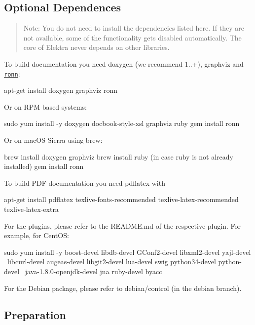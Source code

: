\subsection*{Optional Dependences}

\begin{quote}
Note\+: You do not need to install the dependencies listed here. If they are not available, some of the functionality gets disabled automatically. The core of Elektra never depends on other libraries. \end{quote}


To build documentation you need doxygen (we recommend 1..+), graphviz and \href{https://github.com/rtomayko/ronn/blob/master/INSTALLING#files}{\tt ronn}\+: \begin{DoxyVerb}    apt-get install doxygen graphviz ronn
\end{DoxyVerb}


Or on R\+PM based systems\+: \begin{DoxyVerb}    sudo yum install -y doxygen docbook-style-xsl graphviz ruby
    gem install ronn
\end{DoxyVerb}


Or on mac\+OS Sierra using brew\+: \begin{DoxyVerb}    brew install doxygen graphviz
    brew install ruby (in case ruby is not already installed)
    gem install ronn
\end{DoxyVerb}


To build P\+DF documentation you need {\ttfamily pdflatex} with \begin{DoxyVerb}    apt-get install pdflatex texlive-fonts-recommended texlive-latex-recommended texlive-latex-extra
\end{DoxyVerb}


For the plugins, please refer to the R\+E\+A\+D\+M\+E.\+md of the respective plugin. For example, for Cent\+OS\+: \begin{DoxyVerb}    sudo yum install -y boost-devel libdb-devel GConf2-devel libxml2-devel yajl-devel   \
    libcurl-devel augeas-devel libgit2-devel lua-devel swig python34-devel python-devel \
    java-1.8.0-openjdk-devel jna ruby-devel byacc
\end{DoxyVerb}


For the Debian package, please refer to debian/control (in the debian branch).

\subsection*{Preparation}

